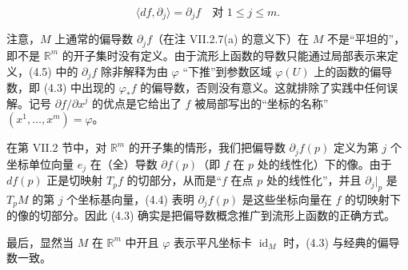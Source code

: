 \begin{equation}
\langle df,\partial_{j}\rangle = \partial_{j}f \quad \text{对 } 1\le j\le m.\tag{4.5}
\end{equation}

注意，$ M $ 上通常的偏导数 $ \partial_{j}f $（在注 VII.2.7(a) 的意义下）在 $ M $ 不是“平坦的”，即不是 $ \mathbb{R}^{m} $ 的开子集时没有定义。由于流形上函数的导数只能通过局部表示来定义，(4.5) 中的 $ \partial_{j}f $ 除非解释为由 $ \varphi $ “下推”到参数区域 $ \varphi(U) $ 上的函数的偏导数，即 (4.3) 中出现的 $ \varphi_{\ast}f $ 的偏导数，否则没有意义。这就排除了实践中任何误解。记号 $ \partial f/\partial x^{j} $ 的优点是它给出了 $ f $ 被局部写出的“坐标的名称” $ (x^{1},\ldots,x^{m}) = \varphi $。

在第 VII.2 节中，对 $ \mathbb{R}^{m} $ 的开子集的情形，我们把偏导数 $ \partial_{j}f(p) $ 定义为第 $ j $ 个坐标单位向量 $ e_{j} $ 在（全）导数 $ \partial f(p) $（即 $ f $ 在 $ p $ 处的线性化）下的像。由于 $ df(p) $ 正是切映射 $ T_{p}f $ 的切部分，从而是“$ f $ 在点 $ p $ 处的线性化”，并且 $ \partial_{j}|_{p} $ 是 $ T_{p}M $ 的第 $ j $ 个坐标基向量，(4.4) 表明 $ \partial_{j}f(p) $ 是这些坐标向量在 $ f $ 的切映射下的像的切部分。因此 (4.3) 确实是把偏导数概念推广到流形上函数的正确方式。

最后，显然当 $ M $ 在 $ \mathbb{R}^{m} $ 中开且 $ \varphi $ 表示平凡坐标卡 $ \operatorname{id}_{M} $ 时，(4.3) 与经典的偏导数一致。

